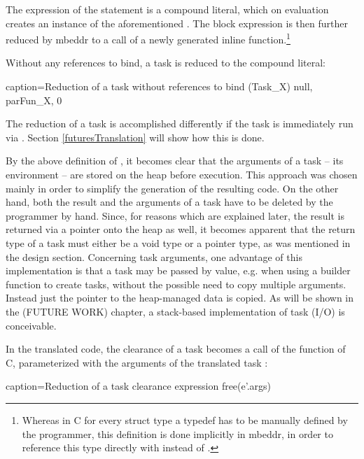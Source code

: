 The expression of the  statement is a compound literal, which on evaluation creates an instance of the aforementioned . The block expression is then further reduced by mbeddr to a call of a newly generated inline function.\footnote{Whereas in C for every struct type  a typedef has to be manually defined by the programmer, this definition is done implicitly in mbeddr, in order to reference this type directly with  instead of .}

Without any references to bind, a task is reduced to the compound literal:

\begin{ccode}{caption=Reduction of a task without references to bind}
(Task_X){ null, parFun_X, 0 }
\end{ccode}

The reduction of a task is accomplished differently if the task is immediately run via . Section \ref{futuresTranslation} will show how this is done.

By the above definition of , it becomes clear that the arguments of a task -- its environment -- are stored on the heap before execution. This approach was chosen mainly in order to simplify the generation of the resulting code. On the other hand, both the result and the arguments of a task have to be deleted by the programmer by hand. Since, for reasons which are explained later, the result is returned via a pointer onto the heap as well, it becomes apparent that the return type of a task must either be a void type or a pointer type, as was mentioned in the design section. Concerning task arguments, one advantage of this implementation is that a task may be passed by value, e.g. when using a builder function to create tasks, without the possible need to copy multiple arguments. Instead just the pointer to the heap-managed data is copied. As will be shown in the (FUTURE WORK) chapter, a stack-based implementation of task (I/O) is conceivable. 

In the translated code, the clearance  of a task becomes a call of the  function of C, parameterized with the arguments of the translated task :
\begin{ccode}{caption=Reduction of a task clearance expression}
free(e'.args)
\end{ccode}

